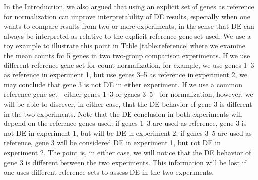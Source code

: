 \documentclass[11pt, a4paper]{article}
\begin{document}
In the Introduction, we also argued that using an explicit set of genes as
reference for normalization can improve interpretability of DE results,
especially when one wants to compare results from two or more experiments, in
the sense that DE can always be interpreted as relative to the explicit
reference gene set used. We use a toy example to illustrate this point in
Table \ref{table:reference} where we examine the mean counts for 5 genes in two
two-group comparison experiments. If we use different reference gene set for
count normalization, for example, we use genes 1--3 as reference in experiment
1, but use genes 3--5 as reference in experiment 2, we may conclude that gene
3 is not DE in either experiment. If we use a common reference gene
set---either genes 1--3 or genes 3--5---for normalization, however, we will be
able to discover, in either case, that the DE behavior of gene 3 is different
in the two experiments. Note that the DE conclusion in both
experiments will depend on the reference genes used: if genes 1--3 are used as
reference, gene 3 is not DE in experiment 1, but will be DE in experiment 2;
if genes 3--5 are used as reference, gene 3 will be considered DE in
experiment 1, but not DE in experiment 2. The point is, in either case, we
will notice that the DE behavior of gene 3 is different between the two
experiments. This information will be lost if one uses different reference
sets to assess DE in the two experiments.


%
\end{document}
